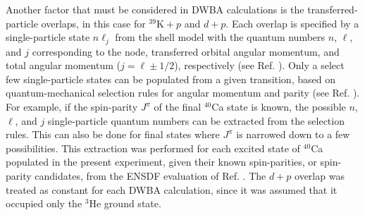 Another factor that must be considered in DWBA calculations is the transferred-particle overlaps, in this case for $^{39}\mathrm{K}+p$ and $d+p$. Each overlap is specified by a single-particle state $n \ell_{j}$ from the shell model with the quantum numbers $n$, $\ell$, and $j$ corresponding to the node, transferred orbital angular momentum, and total angular momentum ($j = \ell \pm 1/2$), respectively (see Ref. \cite{Krane1987}). Only a select few single-particle states can be populated from a given transition, based on quantum-mechanical selection rules for angular momentum and parity (see Ref. \cite{Iliadis2015}). For example, if the spin-parity $J^{\pi}$ of the final $^{40}$Ca state is known, the possible $n$, $\ell$, and $j$ single-particle quantum numbers can be extracted from the selection rules. This can also be done for final states where $J^{\pi}$ is narrowed down to a few possibilities. This extraction was performed for each excited state of $^{40}$Ca populated in the present experiment, given their known spin-parities, or spin-parity candidates, from the ENSDF evaluation of Ref. \cite{Chen2017}. The $d+p$ overlap was treated as constant for each DWBA calculation, since it was assumed that it occupied only the $^{3}$He ground state.

